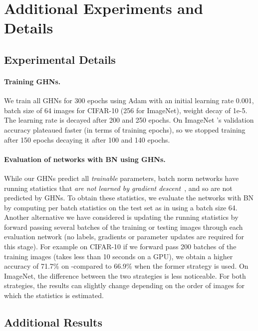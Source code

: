 \section{Additional Experiments and Details\label{apdx:exper}}


\subsection{Experimental Details\label{apdx:details}}


\paragraph{Training GHNs.} 
We train all GHNs for 300 epochs using Adam with an initial learning rate 0.001, batch size of 64 images for CIFAR-10 (256 for ImageNet), weight decay of 1e-5. The learning rate is decayed after 200 and 250 epochs. On ImageNet \ghnours's validation accuracy plateaued faster (in terms of training epochs), so we stopped training after 150 epochs decaying it after 100 and 140 epochs.


\paragraph{Evaluation of networks with BN using GHNs.} While our GHNs predict all \textit{trainable} parameters, batch norm networks have running statistics that \textit{are not learned by gradient descent}~\cite{ioffe2015batch}, and so are not predicted by GHNs. To obtain these statistics, we evaluate the networks with BN by computing per batch statistics on the test set as in \cite{zhang2018graph} using a batch size 64. Another alternative we have considered is updating the running statistics by forward passing several batches of the training or testing images through each evaluation network (no labels, gradients or parameter updates are required for this stage). For example on CIFAR-10 if we forward pass 200 batches of the training images (takes less than 10 seconds on a GPU), we obtain a higher accuracy of 71.7\% on \iid-\iidtest compared to 66.9\% when the former strategy is used. On ImageNet, the difference between the two strategies is less noticeable.
For both strategies, the results can slightly change depending on the order of images for which the statistics is estimated. 


\subsection{Additional Results\label{apdx:results}}

